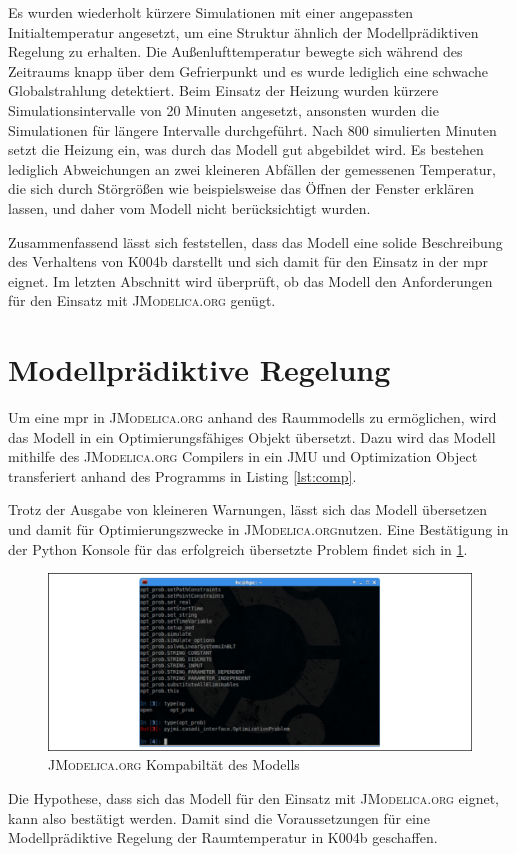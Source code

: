 Es wurden wiederholt kürzere Simulationen mit einer angepassten Initialtemperatur angesetzt, um eine Struktur ähnlich der Modellprädiktiven Regelung zu erhalten. Die Außenlufttemperatur bewegte sich während des Zeitraums knapp über dem Gefrierpunkt und es wurde lediglich eine schwache Globalstrahlung detektiert. Beim Einsatz der Heizung wurden kürzere Simulationsintervalle von 20 Minuten angesetzt, ansonsten wurden die Simulationen für längere Intervalle durchgeführt.
Nach 800 simulierten Minuten setzt die Heizung ein, was durch das Modell gut abgebildet wird. Es bestehen lediglich Abweichungen an zwei kleineren Abfällen der gemessenen Temperatur, die sich durch Störgrößen wie beispielsweise das Öffnen der Fenster erklären lassen, und daher vom Modell nicht berücksichtigt wurden.

Zusammenfassend lässt sich feststellen, dass das Modell eine solide Beschreibung des Verhaltens von K004b darstellt und sich damit für den Einsatz in der \acrlong{mpr} eignet. Im letzten Abschnitt wird überprüft, ob das Modell den Anforderungen für den Einsatz mit \textsc{JModelica.org} genügt.

\section{Modellprädiktive Regelung}

Um eine \acrlong{mpr} in \textsc{\textsc{JModelica.org}} anhand des Raummodells zu ermöglichen, wird das Modell in ein Optimierungsfähiges Objekt übersetzt. Dazu wird das Modell mithilfe des \textsc{JModelica.org} Compilers in ein JMU und Optimization Object transferiert anhand des Programms in Listing \ref{lst:comp}.



Trotz der Ausgabe von kleineren Warnungen, lässt sich das Modell übersetzen und damit für Optimierungszwecke in \textsc{JModelica.org}nutzen. Eine Bestätigung in der Python Konsole für das erfolgreich übersetzte Problem findet sich in \ref{fig:jmod}.

\begin{figure}
\centering
\includegraphics[width=\textwidth]{abbildungen/20160330_mpc}
\caption{\textsc{\textsc{JModelica.org}} Kompabiltät des Modells}
\label{fig:jmod}
\end{figure}

Die Hypothese, dass sich das Modell für den Einsatz mit \textsc{JModelica.org} eignet, kann also bestätigt werden.
Damit sind die Voraussetzungen für eine Modellprädiktive Regelung der Raumtemperatur in K004b geschaffen.